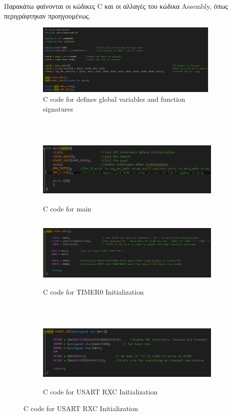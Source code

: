 \documentclass{article}
\begin{document}
	\noindent
	Παρακάτω φαίνονται οι κώδικες C και οι αλλαγές του κώδικα Assembly, όπως περιγράφτηκαν προηγουμένως.
\pagebreak
	\begin{figure}[h!]
		\centering
		\begin{subfigure}[t]{0.5\textwidth}
			\centering
			\includegraphics[height=3.5cm, width=\linewidth]{./results/lab4_defines.png}
			\caption{C code for defines global variables and function signatures}
		\end{subfigure}%
		~
		\begin{subfigure}[t]{0.5\textwidth}
			\centering
			\includegraphics[height=3.5cm, width=\linewidth]{./results/lab4_main.png}
			\caption{C code for main}
		\end{subfigure}
	
		\begin{subfigure}[t]{0.5\textwidth}
			\centering
			\includegraphics[height=3.5cm, width=\linewidth]{./results/lab4_time0_init.png}
			\caption{C code for TIMER0 Initialization}
		\end{subfigure}%
		~
		\begin{subfigure}[t]{0.5\textwidth}
			\centering
			\includegraphics[height=3.5cm, width=\linewidth]{./results/lab4_usart_init.png}
			\caption{C code for USART RXC Initialization}
		\end{subfigure}	
	

\end{figure}
\end{document}
